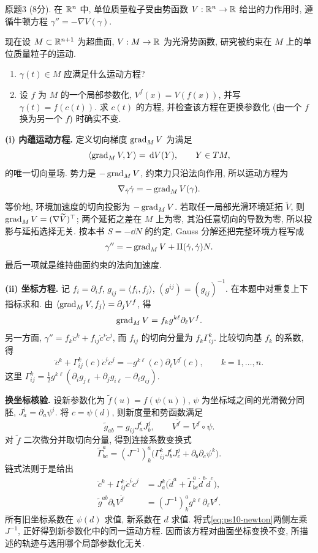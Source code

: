 \par{}
\begin{exercise}\label{ps:10-3}
原题3 (8分). 在 $\mathbb R^n$ 中, 单位质量粒子受由势函数 $V:\mathbb R^n\to\mathbb R$ 给出的力作用时, 遵循牛顿方程 $\gamma''=-\nabla V(\gamma)$.

现在设 $M\subset\mathbb R^{n+1}$ 为超曲面, $V:M\to\mathbb R$ 为光滑势函数, 研究被约束在 $M$ 上的单位质量粒子的运动.
\begin{enumerate}[label=(\roman*)]
\item $\gamma(t)\in M$ 应满足什么运动方程?
\item 设 $f$ 为 $M$ 的一个局部参数化, $V^f(x)=V(f(x))$, 并写 $\gamma(t)=f(c(t))$. 求 $c(t)$ 的方程, 并检查该方程在更换参数化 (由一个 $f$ 换为另一个 $f$) 时确实不变.
\end{enumerate}
\end{exercise}
\begin{solution}
\textbf{(i) 内蕴运动方程.} 定义切向梯度 $\operatorname{grad}_M V$ 为满足
\[
 \langle\operatorname{grad}_M V,Y\rangle=\,\mathrm d V(Y),\qquad Y\in TM,
\]
的唯一切向量场. 势力是 $-\operatorname{grad}_M V$, 约束力只沿法向作用, 所以运动方程为
\[
 \nabla_{\dot\gamma}\dot\gamma=-\operatorname{grad}_M V(\gamma).
\]
等价地, 环境加速度的切向投影为 $-\operatorname{grad}_M V$. 若取任一局部光滑环境延拓 $\widetilde V$, 则 $\operatorname{grad}_M V=(\nabla\widetilde V)^\top$; 两个延拓之差在 $M$ 上为零, 其沿任意切向的导数为零, 所以投影与延拓选择无关. 按本书 $S=-\dd N$ 的约定, Gauss 分解还把完整环境方程写成
\[
 \gamma''=-\operatorname{grad}_M V+\mathrm{II}(\dot\gamma,\dot\gamma)N.
\]
最后一项就是维持曲面约束的法向加速度.

\textbf{(ii) 坐标方程.} 记 $f_i=\partial_i f$, $g_{ij}=\langle f_i,f_j\rangle$, $(g^{ij})=(g_{ij})^{-1}$. 在本题中对重复上下指标求和. 由 $\langle\operatorname{grad}_M V,f_j\rangle=\partial_j V^f$, 得
\[
 \operatorname{grad}_M V=f_k g^{k\ell}\partial_\ell V^f.
\]
另一方面, $\gamma''=f_k\ddot c^k+f_{ij}\dot c^i\dot c^j$, 而 $f_{ij}$ 的切向分量为 $f_k\Gamma^k_{ij}$. 比较切向基 $f_k$ 的系数, 得
\begin{equation}\label{eq:ps10-newton}
 \ddot c^k+\Gamma^k_{ij}(c)\dot c^i\dot c^j
 =-g^{k\ell}(c)\partial_\ell V^f(c),\qquad k=1,\ldots,n.
\end{equation}
这里 $\Gamma^k_{ij}=\tfrac12g^{k\ell}(\partial_i g_{j\ell}+\partial_j g_{i\ell}-\partial_\ell g_{ij})$.

\textbf{换坐标核验.} 设新参数化为 $\widetilde f(u)=f(\psi(u))$, $\psi$ 为坐标域之间的光滑微分同胚, $J^i_a=\partial_a\psi^i$. 将 $c=\psi(d)$, 则新度量和势函数满足
\[
 \widetilde g_{ab}=g_{ij}J^i_aJ^j_b,\qquad
 V^{\widetilde f}=V^f\circ\psi.
\]
对 $\widetilde f$ 二次微分并取切向分量, 得到连接系数变换式
\[
 \widetilde\Gamma^a_{bc}
 =(J^{-1})^a_k\bigl(\Gamma^k_{ij}J^i_bJ^j_c
 +\partial_b\partial_c\psi^k\bigr).
\]
链式法则于是给出
\begin{align*}
 \ddot c^k+\Gamma^k_{ij}\dot c^i\dot c^j
 &=J^k_a\bigl(\ddot d^a+\widetilde\Gamma^a_{bc}\dot d^b\dot d^c\bigr),\\
 \widetilde g^{ab}\partial_b V^{\widetilde f}
 &=(J^{-1})^a_k g^{k\ell}\partial_\ell V^f.
\end{align*}
所有旧坐标系数在 $\psi(d)$ 求值, 新系数在 $d$ 求值. 将式\eqref{eq:ps10-newton}两侧左乘 $J^{-1}$, 正好得到新参数化中的同一运动方程. 因而该方程对曲面坐标变换不变, 所描述的轨迹与选用哪个局部参数化无关.
\end{solution}
